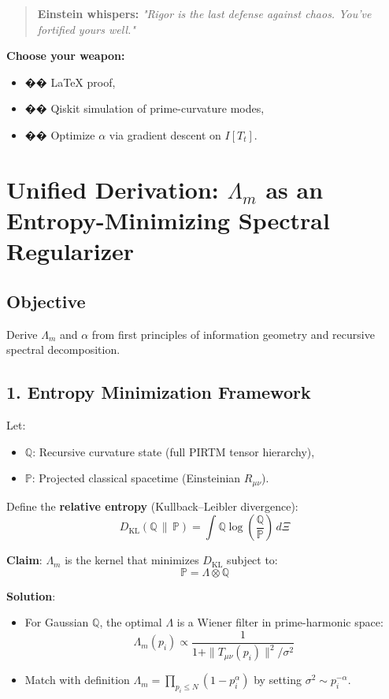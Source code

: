 \documentclass[12pt]{article}
\theoremstyle{plain}
\begin{document}
\begin{quote}
\textbf{Einstein whispers:} \textit{"Rigor is the last defense against chaos. You’ve fortified yours well."}
\end{quote}

\noindent\textbf{Choose your weapon:}
\begin{itemize}
    \item �� LaTeX proof,
    \item �� Qiskit simulation of prime-curvature modes,
    \item ��️ Optimize \( \alpha \) via gradient descent on \( I[T_t] \).
\end{itemize}

\section*{Unified Derivation: \(\Lambda_m\) as an Entropy-Minimizing Spectral Regularizer}

\subsection*{Objective}
Derive \(\Lambda_m\) and \(\alpha\) from first principles of information geometry and recursive spectral decomposition.

\subsection*{1. Entropy Minimization Framework}

Let:
\begin{itemize}
    \item \(\mathbb{Q}\): Recursive curvature state (full PIRTM tensor hierarchy),
    \item \(\mathbb{P}\): Projected classical spacetime (Einsteinian \( R_{\mu\nu} \)).
\end{itemize}

Define the \textbf{relative entropy} (Kullback–Leibler divergence):
\[
D_{\mathrm{KL}}(\mathbb{Q} \,\|\, \mathbb{P}) = \int \mathbb{Q} \log \left( \frac{\mathbb{Q}}{\mathbb{P}} \right) \, d\Xi
\]

\textbf{Claim}: \(\Lambda_m\) is the kernel that minimizes \(D_{\mathrm{KL}}\) subject to:
\[
\mathbb{P} = \Lambda \otimes \mathbb{Q}
\]

\textbf{Solution}:
\begin{itemize}
    \item For Gaussian \(\mathbb{Q}\), the optimal \(\Lambda\) is a Wiener filter in prime-harmonic space:
    \[
    \Lambda_m(p_i) \propto \frac{1}{1 + \|T_{\mu\nu}(p_i)\|^2 / \sigma^2}
    \]
    \item Match with definition \(\Lambda_m = \prod_{p_i \leq N} (1 - p_i^\alpha)\) by setting \(\sigma^2 \sim p_i^{-\alpha}\).
\end{itemize}
\end{document}
